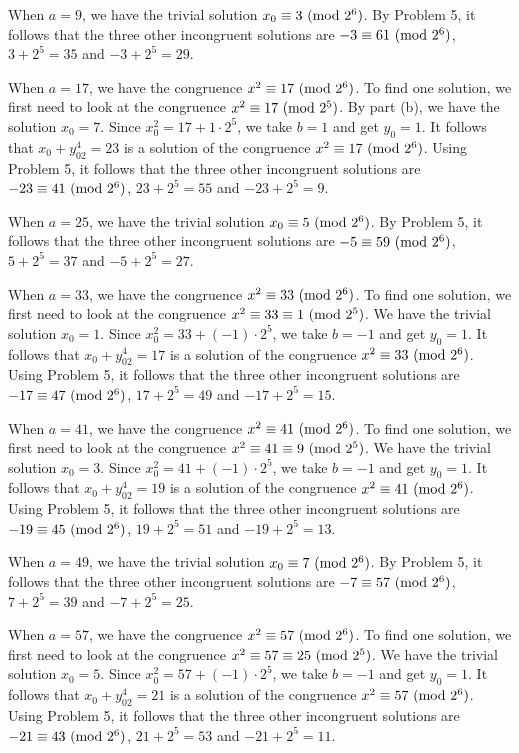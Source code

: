 \begin{solution}
\begin{enumerate}
        When $a = 9$, we have the trivial solution $x_0 \equiv 3 \ (\mathrm{mod}\ 2^6)$. By Problem 5, it follows that the three other incongruent solutions are $-3 \equiv 61 \ (\mathrm{mod}\ 2^6)$, $3 + 2^5 = 35$ and $-3 + 2^5 = 29$.

        When $a = 17$, we have the congruence $x^2 \equiv 17 \ (\mathrm{mod}\ 2^6)$. To find one solution, we first need to look at the congruence $x^2 \equiv 17  \ (\mathrm{mod}\ 2^5)$. By part (b), we have the solution $x_0 = 7$. Since $x_0^2 = 17 + 1\cdot 2^5$, we take $b = 1$ and get $y_0 = 1$. It follows that $x_0 + y_02^4 =23$ is a solution of the congruence $x^2 \equiv 17 \ (\mathrm{mod}\ 2^6)$. Using Problem 5, it follows that the three other incongruent solutions are $-23 \equiv 41 \ (\mathrm{mod}\ 2^6)$, $23 + 2^5 = 55$ and $-23 + 2^5 = 9$.

        When $a = 25$, we have the trivial solution $x_0 \equiv 5 \ (\mathrm{mod}\ 2^6)$. By Problem 5, it follows that the three other incongruent solutions are $-5 \equiv 59 \ (\mathrm{mod}\ 2^6)$, $5 + 2^5 = 37$ and $-5 + 2^5 = 27$.
        
        When $a = 33$, we have the congruence $x^2 \equiv 33 \ (\mathrm{mod}\ 2^6)$. To find one solution, we first need to look at the congruence $x^2 \equiv 33 \equiv 1 \ (\mathrm{mod}\ 2^5)$. We have the trivial solution $x_0 = 1$. Since $x_0^2 = 33 + (-1)\cdot 2^5$, we take $b = -1$ and get $y_0 = 1$. It follows that $x_0 + y_02^4 = 17$ is a solution of the congruence $x^2 \equiv 33 \ (\mathrm{mod}\ 2^6)$. Using Problem 5, it follows that the three other incongruent solutions are $-17 \equiv 47 \ (\mathrm{mod}\ 2^6)$, $17 + 2^5 = 49$ and $-17 + 2^5 = 15$.
        
        When $a = 41$, we have the congruence $x^2 \equiv 41 \ (\mathrm{mod}\ 2^6)$. To find one solution, we first need to look at the congruence $x^2 \equiv 41 \equiv 9 \ (\mathrm{mod}\ 2^5)$. We have the trivial solution $x_0 = 3$. Since $x_0^2 = 41 + (-1)\cdot 2^5$, we take $b = -1$ and get $y_0 = 1$. It follows that $x_0 + y_02^4 = 19$ is a solution of the congruence $x^2 \equiv 41 \ (\mathrm{mod}\ 2^6)$. Using Problem 5, it follows that the three other incongruent solutions are $-19 \equiv 45 \ (\mathrm{mod}\ 2^6)$, $19 + 2^5 = 51$ and $-19 + 2^5 = 13$.
        
        When $a = 49$, we have the trivial solution $x_0 \equiv 7 \ (\mathrm{mod}\ 2^6)$. By Problem 5, it follows that the three other incongruent solutions are $-7 \equiv 57 \ (\mathrm{mod}\ 2^6)$, $7 + 2^5 = 39$ and $-7 + 2^5 = 25$.
        
        When $a = 57$, we have the congruence $x^2 \equiv 57 \ (\mathrm{mod}\ 2^6)$. To find one solution, we first need to look at the congruence $x^2 \equiv 57 \equiv 25 \ (\mathrm{mod}\ 2^5)$. We have the trivial solution $x_0 = 5$. Since $x_0^2 = 57 + (-1)\cdot 2^5$, we take $b = -1$ and get $y_0 = 1$. It follows that $x_0 + y_02^4 = 21$ is a solution of the congruence $x^2 \equiv 57 \ (\mathrm{mod}\ 2^6)$. Using Problem 5, it follows that the three other incongruent solutions are $-21 \equiv 43 \ (\mathrm{mod}\ 2^6)$, $21 + 2^5 = 53$ and $-21 + 2^5 = 11$. \\
    \end{enumerate}
\end{solution}

